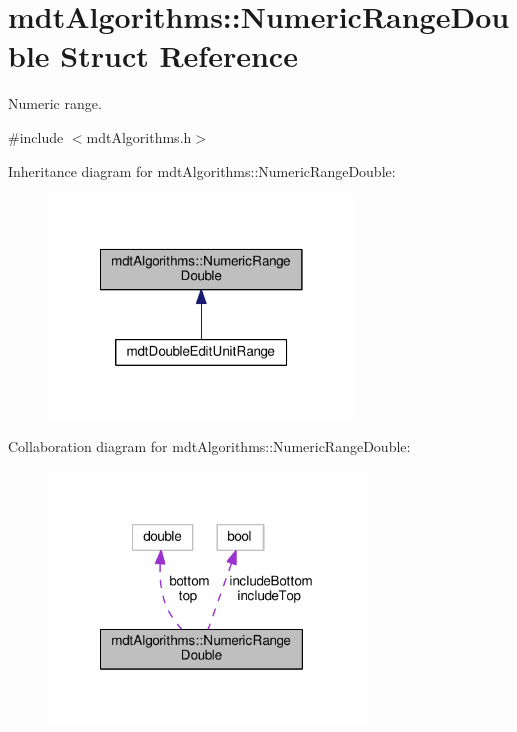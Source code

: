\hypertarget{structmdt_algorithms_1_1_numeric_range_double}{\section{mdt\-Algorithms\-:\-:Numeric\-Range\-Double Struct Reference}
\label{structmdt_algorithms_1_1_numeric_range_double}
}


Numeric range.  




{\ttfamily \#include $<$mdt\-Algorithms.\-h$>$}



Inheritance diagram for mdt\-Algorithms\-:\-:Numeric\-Range\-Double\-:\nopagebreak
\begin{figure}[H]
\begin{center}
\leavevmode
\includegraphics[width=230pt]{structmdt_algorithms_1_1_numeric_range_double__inherit__graph}
\end{center}
\end{figure}


Collaboration diagram for mdt\-Algorithms\-:\-:Numeric\-Range\-Double\-:\nopagebreak
\begin{figure}[H]
\begin{center}
\leavevmode
\includegraphics[width=239pt]{structmdt_algorithms_1_1_numeric_range_double__coll__graph}
\end{center}
\end{figure}
